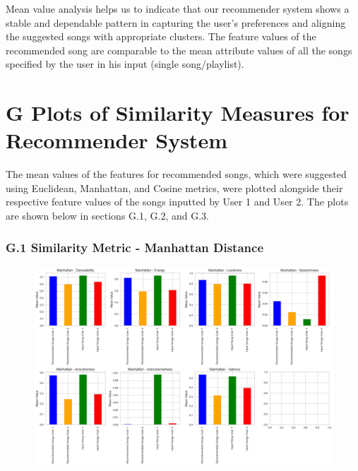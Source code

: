 \documentclass{article}
\begin{document}
Mean value analysis helps us to indicate that our recommender system shows a stable and dependable pattern in capturing the user's preferences and aligning the suggested songs with appropriate clusters. The feature values of the recommended song are comparable to the mean attribute values of all the songs specified by the user in his input (single song/playlist).
\clearpage
\section*{G Plots of Similarity Measures for Recommender System}

The mean values of the features for recommended songs, which were suggested using Euclidean, Manhattan, and Cosine metrics, were plotted alongside their respective feature values of the songs inputted by User 1 and User 2. The plots are shown below in sections G.1, G.2, and G.3.




\label{app:RECOM_MEAN_PLOT}
\subsubsection*{G.1 Similarity Metric - Manhattan Distance}
\label{app:Manhattan}
\begin{figure}[H]
    \centering
    \includegraphics[width=0.9\linewidth]{Images/manhattan_mean_values.png}
\end{figure}
\end{document}
